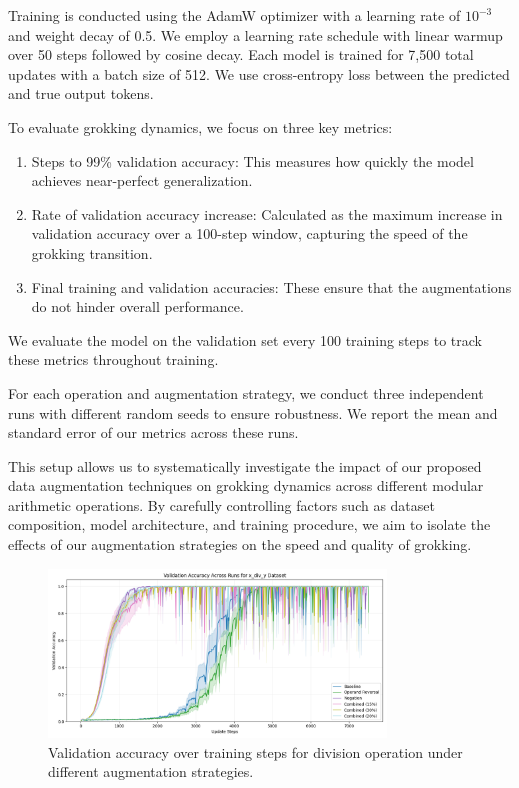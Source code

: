 \documentclass{article} %
\begin{document}
Training is conducted using the AdamW optimizer \cite{loshchilov2017adamw} with a learning rate of $10^{-3}$ and weight decay of 0.5. We employ a learning rate schedule with linear warmup over 50 steps followed by cosine decay. Each model is trained for 7,500 total updates with a batch size of 512. We use cross-entropy loss between the predicted and true output tokens.

To evaluate grokking dynamics, we focus on three key metrics:

\begin{enumerate}
    \item Steps to 99\% validation accuracy: This measures how quickly the model achieves near-perfect generalization.
    \item Rate of validation accuracy increase: Calculated as the maximum increase in validation accuracy over a 100-step window, capturing the speed of the grokking transition.
    \item Final training and validation accuracies: These ensure that the augmentations do not hinder overall performance.
\end{enumerate}

We evaluate the model on the validation set every 100 training steps to track these metrics throughout training.

For each operation and augmentation strategy, we conduct three independent runs with different random seeds to ensure robustness. We report the mean and standard error of our metrics across these runs.

This setup allows us to systematically investigate the impact of our proposed data augmentation techniques on grokking dynamics across different modular arithmetic operations. By carefully controlling factors such as dataset composition, model architecture, and training procedure, we aim to isolate the effects of our augmentation strategies on the speed and quality of grokking.

\begin{figure}[h]
    \centering
    \includegraphics[width=0.8\textwidth]{val_acc_x_div_y.png}
    \caption{Validation accuracy over training steps for division operation under different augmentation strategies.}
    \label{fig:val_acc_div}
\end{figure}
\end{document}

